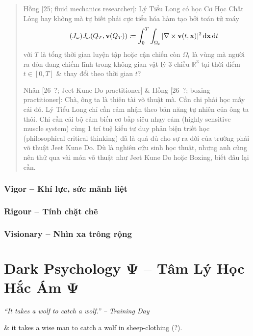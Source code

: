 \documentclass[12pt]{article}
\begin{document}
\begin{quotation}
	{\sf Hồng [25; fluid mechanics researcher]}: {\sc Lý Tiểu Long} có học Cơ Học Chất Lỏng hay không mà tự biết phải cực tiểu hóa hàm tạo bởi toán tử xoáy
	\begin{equation}
		\label{curl cost functional}
		\tag{$J_\omega$}
		J_\omega(Q_T,{\bf v}(Q_T))\coloneqq\int_0^T\int_{\Omega_t} |\nabla\times{\bf v}(t,{\bf x})|^2\,{\rm d}{\bf x}\,{\rm d}t
	\end{equation}
	với $T$ là tổng thời gian luyện tập hoặc cận chiến còn $\Omega_t$ là vùng mà người ra đòn đang chiếm lĩnh trong không gian vật lý 3 chiều $\mathbb{R}^3$ tại thời điểm $t\in[0,T]$ \& thay đổi theo thời gian $t$?
	
	{\sf Nhân [26--?; Jeet Kune Do practitioner] \& Hồng [26--?; boxing practitioner]}: Chà, ông ta là thiên tài võ thuật mà. Cần chi phải học mấy cái đó. {\sc Lý Tiểu Long} chỉ cần cảm nhận theo bản năng tự nhiên của ông ta thôi. Chỉ cần cái bộ cảm biến cơ bắp siêu nhạy cảm (highly sensitive muscle system) cùng 1 trí tuệ kiểu tư duy phản biện triết học (philosophical critical thinking) đã là quá đủ cho sự ra đời của trường phái võ thuật Jeet Kune Do. Dù là nghiên cứu sinh học thuật, nhưng anh cũng nên thử qua vài món võ thuật như Jeet Kune Do hoặc Boxing, biết đâu lại cần.
\end{quotation}

\subsubsection{Vigor -- Khí lực, sức mãnh liệt}

\subsubsection{Rigour -- Tính chặt chẽ}

\subsubsection{Visionary -- Nhìn xa trông rộng}


\section{Dark Psychology $\boldsymbol{\Psi}$ -- Tâm Lý Học Hắc Ám $\boldsymbol{\Psi}$}

\begin{flushright}\it
	``It takes a wolf to catch a wolf.'' -- Training Day
\end{flushright}
\& it takes a wise man to catch a wolf in sheep-clothing (?).
\end{document}
